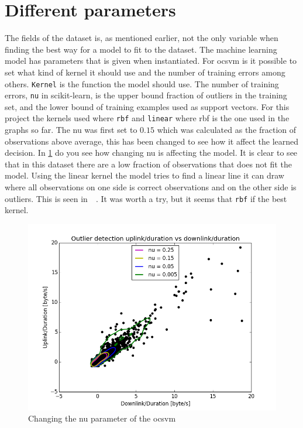 \section{Different parameters}
The fields of the dataset is, as mentioned earlier, not the only variable when finding the best way for a model to fit to the dataset. The machine learning model has parameters that is given when instantiated. For \gls{ocsvm} is it possible to set what kind of kernel it should use and the number of training errors among others. \texttt{Kernel} is the function the model should use. The number of training errors, \texttt{nu} in scikit-learn, is the upper bound fraction of outliers in the training set, and the lower bound of training examples used as support vectors. For this project the kernels used where \texttt{rbf} and \texttt{linear} where rbf is the one used in the graphs so far. 
The nu was first set to $0.15$ which was calculated as the fraction of observations above average, this has been changed to see how it affect the learned decision. In \ref{fig:differentNu} do you see how changing nu is affecting the model. It is clear to see that in this dataset there are a low fraction of observations that does not fit the model. Using the linear kernel the model tries to find a linear line it can draw where all observations on one side is correct observations and on the other side is outliers. This is seen in $ $ $ $ $ $. It was worth a try, but it seems that \texttt{rbf} if the best kernel. 

\begin{figure}
\centering
\includegraphics[scale=0.6]{figs/differentNu.png}
\caption{Changing the nu parameter of the \gls{ocsvm}}
\label{fig:differentNu}
\end{figure}



